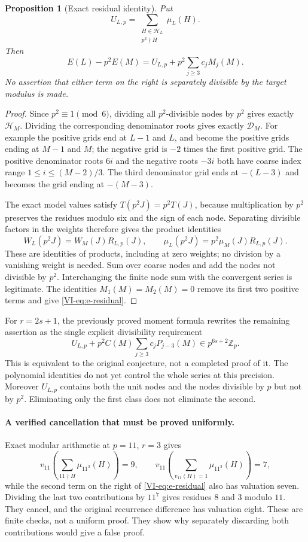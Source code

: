 \documentclass[11pt,letterpaper]{article}
\newtheorem{proposition}[theorem]{Proposition}
\numberwithin{equation}{section}
\begin{document}
\begin{proposition}[Exact residual identity]\label{VI-prop:e-residual}
Put
\[
 U_{L,p}=\sum_{\substack{H\in\mathcal H_L\\p^2\nmid H}}\mu_L(H).
\]
Then
\begin{equation}\label{VI-eq:e-residual}
 \boxed{E(L)-p^2E(M)
 =U_{L,p}+p^2\sum_{j\ge3}c_j M_j(M).}
\end{equation}
No assertion that either term on the right is separately divisible
by the target modulus is made.
\end{proposition}
\begin{proof}
Since $p^2\equiv1\pmod6$, dividing all $p^2$-divisible nodes by
$p^2$ gives exactly $\mathcal H_M$. Dividing the corresponding
denominator roots gives exactly $\mathcal D_M$. For example the
positive grids end at $L-1$ and $L$, and become the positive grids
ending at $M-1$ and $M$; the negative grid is $-2$ times the first
positive grid. The positive denominator roots $6i$ and the negative
roots $-3i$ both have coarse index range
$1\le i\le(M-2)/3$. The third denominator grid ends at $-(L-3)$
and becomes the grid ending at $-(M-3)$.

The exact model values satisfy $T(p^2J)=p^2T(J)$, because
multiplication by $p^2$ preserves the residues modulo six and the
sign of each node. Separating divisible factors in the weights
therefore gives the product identities
\[
 W_L(p^2J)=W_M(J)R_{L,p}(J),\qquad
 \mu_L(p^2J)=p^2\mu_M(J)R_{L,p}(J).
\]
These are identities of products, including at zero weights;
no division by a vanishing weight is needed. Sum over coarse nodes
and add the nodes not divisible by $p^2$. Interchanging the finite
node sum with the convergent series is legitimate. The identities
$M_1(M)=M_2(M)=0$ remove its first two positive terms and give
\eqref{VI-eq:e-residual}.
\end{proof}

For $r=2s+1$, the previously proved moment formula rewrites the
remaining assertion as the single explicit divisibility requirement
\[
 U_{L,p}+p^2C(M)\sum_{j\ge3}c_jP_{j-3}(M)
 \in p^{6s+2}\mathbb Z_p.
\]
This is equivalent to the original conjecture, not a completed
proof of it. The polynomial identities do not yet control the
whole series at this precision. Moreover $U_{L,p}$ contains both
the unit nodes and the nodes divisible by $p$ but not by $p^2$.
Eliminating only the first class does not eliminate the second.

\paragraph{A verified cancellation that must be proved uniformly.}
Exact modular arithmetic at $p=11$, $r=3$ gives
\[
 v_{11}\!\left(\sum_{11\nmid H}\mu_{11^3}(H)\right)=9,
 \qquad
 v_{11}\!\left(\sum_{v_{11}(H)=1}\mu_{11^3}(H)\right)=7,
\]
while the second term on the right of \eqref{VI-eq:e-residual} also
has valuation seven. Dividing the last two contributions by $11^7$
gives residues $8$ and $3$ modulo $11$. They cancel, and the
original recurrence difference has valuation eight. These are
finite checks, not a uniform proof. They show why separately
discarding both contributions would give a false proof.
\end{document}
